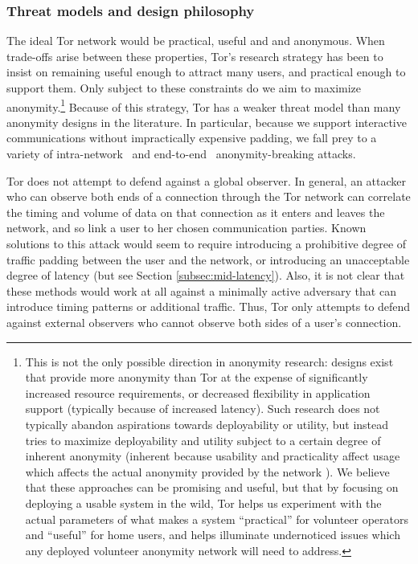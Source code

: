\documentclass{llncs}
\begin{document}
\subsubsection{Threat models and design philosophy}
The ideal Tor network would be practical, useful and and anonymous. When
trade-offs arise between these properties, Tor's research strategy has been
to insist on remaining useful enough to attract many users,
and practical enough to support them.  Only subject to these
constraints do we aim to maximize
anonymity.\footnote{This is not the only possible
direction in anonymity research: designs exist that provide more anonymity
than Tor at the expense of significantly increased resource requirements, or
decreased flexibility in application support (typically because of increased
latency).  Such research does not typically abandon aspirations towards
deployability or utility, but instead tries to maximize deployability and
utility subject to a certain degree of inherent anonymity (inherent because
usability and practicality affect usage which affects the actual anonymity
provided by the network \cite{back01,econymics}). We believe that these
approaches can be promising and useful, but that by focusing on deploying a
usable system in the wild, Tor helps us experiment with the actual parameters
of what makes a system ``practical'' for volunteer operators and ``useful''
for home users, and helps illuminate undernoticed issues which any deployed
volunteer anonymity network will need to address.}
Because of this strategy, Tor has a weaker threat model than many anonymity
designs in the literature.   In particular, because we
support interactive communications without impractically expensive padding,
we fall prey to a variety
of intra-network~\cite{back01,attack-tor-oak05,flow-correlation04} and
end-to-end~\cite{danezis-pet2004,SS03} anonymity-breaking attacks.


Tor does not attempt to defend against a global observer.  In general, an
attacker who can observe both ends of a connection through the Tor network
can correlate the timing and volume of data on that connection as it enters
and leaves the network, and so link a user to her chosen communication
parties.  Known solutions to this attack would seem to require introducing a
prohibitive degree of traffic padding between the user and the network, or
introducing an unacceptable degree of latency (but see Section
\ref{subsec:mid-latency}).  Also, it is not clear that these methods would
work at all against a minimally active adversary that can introduce timing
patterns or additional traffic.  Thus, Tor only attempts to defend against
external observers who cannot observe both sides of a user's connection.
\end{document}
